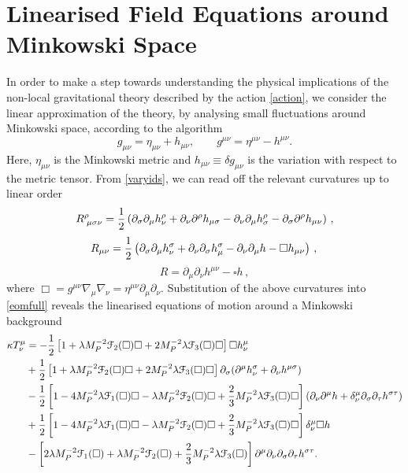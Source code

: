 \section{Linearised Field Equations around Minkowski Space}
\label{sec:linkmink}
In order to make a step towards understanding the physical implications of the non-local gravitational theory described by the action \eqref{action}, we consider the linear approximation of the theory, by analysing small fluctuations around Minkowski space, according to the algorithm 
\[
\label{pertmink}
g_{\mu\nu}=\eta_{\mu\nu}+ h_{\mu\nu},\qquad g^{\mu\nu}=\eta^{\mu\nu}-h^{\mu\nu}
.\]
Here, $\eta_{\mu\nu}$ is the Minkowski metric and $h_{\mu\nu}\equiv \delta g_{\mu\nu}$ is the variation with respect to the metric tensor. From \eqref{varyids}, we can read off the relevant curvatures up to linear order
\[
\label{MinkRiem}
R^\rho_{\;\mu\sigma\nu}=\frac{1}{2}\left(\partial_{\sigma}\partial_{\mu}h^\rho_{\nu}
+\partial_{\nu}\partial^\rho h_{\mu\sigma}-\partial_{\nu}\partial_{\mu}h^\rho_{\sigma}-\partial_{\sigma}\partial^{\rho}h_{\mu\nu}\right)\,,
\nonumber\]
\[
\nonumber\label{MinkRicci}
R_{\mu\nu}=\frac{1}{2}\left(\partial_{\sigma}\partial_{\mu}h_{\nu}^{\sigma}
+\partial_{\nu}\partial_{\sigma}h_{\mu}^{\sigma}-\partial_{\nu}\partial_{\mu}
h-\Box h_{\mu\nu}\right)\,,
\\
\] 
\[
\label{MinkR}
R=\partial_{\mu}\partial_{\nu}h^{\mu\nu}-\square h\,,
\]
 where $\Box=g^{\mu\nu}\nabla_{\mu} \nabla_{\nu}=\eta^{\mu\nu}\partial_\mu \partial_\nu$.
Substitution of  the above curvatures into \eqref{eomfull} reveals the linearised equations of motion around a Minkowski background
\begin{align}
\label{eommink}
\kappa T_{\nu}^{\mu}	&=	-\frac{1}{2}\left[1+\lambda M_{P}^{-2}{\cal F}_{2}(\Box)\square+2M_{P}^{-2}\lambda{\cal F}_{3}(\Box)\square\right]\square h_{\nu}^{\mu}
		\nonumber\\&+\frac{1}{2}\left[1+\lambda M_{P}^{-2}{\cal F}_{2}(\Box)\Box+2M_{P}^{-2}\lambda{\cal F}_{3}(\Box)\square\right]\partial_{\sigma}(\partial^{\mu}h_{\nu}^{\sigma}+\partial_{\nu}h^{\mu\sigma})\nonumber
		\\&-\frac{1}{2}\left[1-4M_{P}^{-2}\lambda{\cal F}_{1}(\Box)\square-\lambda M_{P}^{-2}{\cal F}_{2}(\Box)\square+\frac{2}{3}M_{P}^{-2}\lambda{\cal F}_{3}(\Box)\square\right]\left(\partial_{\nu}\partial^{\mu}h+\delta_{\nu}^{\mu}\partial_{\sigma}\partial_{\tau}h^{\sigma\tau}\right)
		\nonumber\\&+\frac{1}{2}\left[1-4M_{P}^{-2}\lambda{\cal F}_{1}(\Box)\Box-\lambda M_{P}^{-2}{\cal F}_{2}(\Box)\Box+\frac{2}{3}M_{P}^{-2}\lambda{\cal F}_{3}(\Box)\square\right]\delta_{\nu}^{\mu}\Box h\nonumber
		\\&-\left[2\lambda M_{P}^{-2}{\cal F}_{1}(\Box)+\lambda M_{P}^{-2}{\cal F}_{2}(\Box)+\frac{2}{3}M_{P}^{-2}\lambda{\cal F}_{3}(\Box)\right]\partial^{\mu}\partial_{\nu}\partial_{\sigma}\partial_{\tau}h^{\sigma\tau}.
   \end{align}

